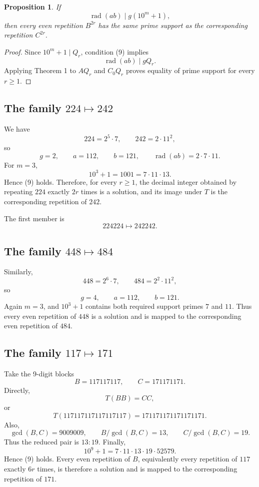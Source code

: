 \documentclass[11pt]{article}
\newtheorem{proposition}{Proposition}
\newcommand{\rad}{\operatorname{rad}}
\begin{document}
\begin{proposition}
If
\[
\rad(ab)\mid g(10^m+1),
\tag{9}
\]
then every even repetition \(B^{2r}\) has the same prime support as the corresponding repetition \(C^{2r}\).
\end{proposition}

\begin{proof}
Since \(10^m+1\mid Q_r\), condition (9) implies
\[
\rad(ab)\mid gQ_r.
\]
Applying Theorem 1 to \(AQ_r\) and \(C_0Q_r\) proves equality of prime support for every \(r\ge1\).
\end{proof}

\subsection{\texorpdfstring{The family $224\mapsto242$}{The family 224 -> 242}}

We have
\[
224=2^5\cdot7,\qquad242=2\cdot11^2,
\]
so
\[
g=2,\qquad a=112,\qquad b=121,\qquad
\rad(ab)=2\cdot7\cdot11.
\]
For \(m=3\),
\[
10^3+1=1001=7\cdot11\cdot13.
\]
Hence (9) holds. Therefore, for every \(r\ge1\), the decimal integer obtained by repeating \(224\) exactly \(2r\) times is a solution, and its image under \(T\) is the corresponding repetition of \(242\).

The first member is
\[
224224\mapsto242242.
\]

\subsection{\texorpdfstring{The family $448\mapsto484$}{The family 448 -> 484}}

Similarly,
\[
448=2^6\cdot7,\qquad484=2^2\cdot11^2,
\]
so
\[
g=4,\qquad a=112,\qquad b=121.
\]
Again \(m=3\), and \(10^3+1\) contains both required support primes \(7\) and \(11\). Thus every even repetition of \(448\) is a solution and is mapped to the corresponding even repetition of \(484\).

\subsection{\texorpdfstring{The family $117\mapsto171$}{The family 117 -> 171}}

Take the 9-digit blocks
\[
B=117117117,\qquad C=171171171.
\]
Directly,
\[
T(BB)=CC,
\]
or
\[
T(117117117117117117)
=
171171171171171171.
\]
Also,
\[
\gcd(B,C)=9009009,\qquad
B/\gcd(B,C)=13,\qquad
C/\gcd(B,C)=19.
\]
Thus the reduced pair is \(13:19\). Finally,
\[
10^9+1=7\cdot11\cdot13\cdot19\cdot52579.
\]
Hence (9) holds. Every even repetition of \(B\), equivalently every repetition of \(117\) exactly \(6r\) times, is therefore a solution and is mapped to the corresponding repetition of \(171\).
\end{document}
